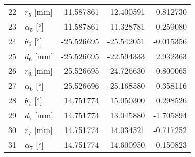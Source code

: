\documentclass{standalone}%
\begin{document}
\begin{tabular}{llrrr}
22 &              $r_{5}$ [mm] &  11.587861 &  12.400591 &   0.812730 \\
23 &  $\alpha_{5}$ [$\degree$] &  11.587861 &  11.328781 &  -0.259080 \\
24 &  $\theta_{6}$ [$\degree$] & -25.526695 & -25.542051 &  -0.015356 \\
25 &              $d_{6}$ [mm] & -25.526695 & -22.594333 &   2.932363 \\
26 &              $r_{6}$ [mm] & -25.526695 & -24.726630 &   0.800065 \\
27 &  $\alpha_{6}$ [$\degree$] & -25.526696 & -25.168580 &   0.358116 \\
28 &  $\theta_{7}$ [$\degree$] &  14.751774 &  15.050300 &   0.298526 \\
29 &              $d_{7}$ [mm] &  14.751774 &  13.045880 &  -1.705894 \\
30 &              $r_{7}$ [mm] &  14.751774 &  14.034521 &  -0.717252 \\
31 &  $\alpha_{7}$ [$\degree$] &  14.751774 &  14.600950 &  -0.150823 \\
\bottomrule
\end{tabular}
%
\end{document}
